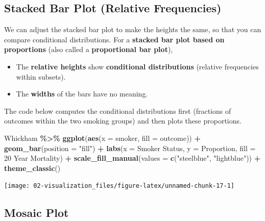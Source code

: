 \documentclass[
]{book}
\newenvironment{Shaded}{\begin{snugshade}}{\end{snugshade}}
\newcommand{\AttributeTok}[1]{\textcolor[rgb]{0.13,0.29,0.53}{#1}}
\newcommand{\FunctionTok}[1]{\textcolor[rgb]{0.13,0.29,0.53}{\textbf{#1}}}
\newcommand{\NormalTok}[1]{#1}
\newcommand{\SpecialCharTok}[1]{\textcolor[rgb]{0.81,0.36,0.00}{\textbf{#1}}}
\newcommand{\StringTok}[1]{\textcolor[rgb]{0.31,0.60,0.02}{#1}}
\providecommand{\tightlist}{%
  \setlength{\itemsep}{0pt}\setlength{\parskip}{0pt}}
\begin{document}
\subsection{Stacked Bar Plot (Relative Frequencies)}\label{stacked-bar-plot-relative-frequencies}

We can adjust the stacked bar plot to make the heights the same, so that you can compare conditional distributions. For a \textbf{stacked bar plot based on proportions} (also called a \textbf{proportional bar plot}),

\begin{itemize}
\tightlist
\item
  The \textbf{relative heights} show \textbf{conditional distributions} (relative frequencies within subsets).
\item
  The \textbf{widths} of the bars have no meaning.
\end{itemize}

The code below computes the conditional distributions first (fractions of outcomes within the two smoking groups) and then plots these proportions.

\begin{Shaded}
\begin{Highlighting}[]
\NormalTok{Whickham }\SpecialCharTok{\%\textgreater{}\%}
    \FunctionTok{ggplot}\NormalTok{(}\FunctionTok{aes}\NormalTok{(}\AttributeTok{x =}\NormalTok{ smoker, }\AttributeTok{fill =}\NormalTok{ outcome)) }\SpecialCharTok{+}
    \FunctionTok{geom\_bar}\NormalTok{(}\AttributeTok{position =} \StringTok{"fill"}\NormalTok{) }\SpecialCharTok{+}
    \FunctionTok{labs}\NormalTok{(}\AttributeTok{x =} \StringTok{\textquotesingle{}Smoker Status\textquotesingle{}}\NormalTok{, }\AttributeTok{y =} \StringTok{\textquotesingle{}Proportion\textquotesingle{}}\NormalTok{, }\AttributeTok{fill =} \StringTok{\textquotesingle{}20 Year Mortality\textquotesingle{}}\NormalTok{) }\SpecialCharTok{+} 
    \FunctionTok{scale\_fill\_manual}\NormalTok{(}\AttributeTok{values =} \FunctionTok{c}\NormalTok{(}\StringTok{"steelblue"}\NormalTok{, }\StringTok{"lightblue"}\NormalTok{)) }\SpecialCharTok{+} 
    \FunctionTok{theme\_classic}\NormalTok{()}
\end{Highlighting}
\end{Shaded}

\begin{center}\texttt{[image: 02-visualization\_files/figure-latex/unnamed-chunk-17-1]} \end{center}

\subsection{Mosaic Plot}\label{mosaic-plot}
\end{document}
